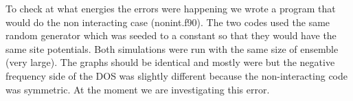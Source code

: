 \documentclass{article}
\begin{document}
To check at what energies the errors were happening we wrote a program that would do the non interacting case (nonint.f90). The two codes used the same random generator which was seeded to a constant so that they would have the same site potentials. Both simulations were run with the same size of ensemble (very large). The graphs should be identical and mostly were but the negative frequency side of the DOS was slightly different because the non-interacting code was symmetric. At the moment we are investigating this error.
\end{document}

